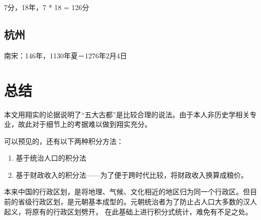 7分，18年，7 * 18 = 126分


\subsection{杭州}
南宋：146年，1130年夏－1276年2月4日

\section{总结}
本文用翔实的论据说明了“五大古都”是比较合理的说法。由于本人非历史学相关专业，故此对于细节上的考据难以做到翔实充分。

可以预见的，还有以下两种积分方法：
\begin{enumerate}
\item 基于统治人口的积分法
\item 基于财政收入的积分法——为了便于跨时代比较，将财政收入换算成粮价。
\end{enumerate}

本来中国的行政区划，是将地理、气候、文化相近的地区归为同一个行政区。但目前的省级行政区划，是元朝基本成型的。元朝统治者为了防止占人口大多数的汉人起义，将原有的行政区划劈开，
在此基础上进行积分式统计，难免有不足之处。